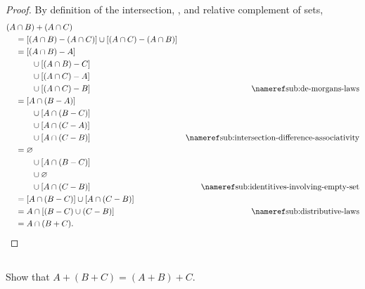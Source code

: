 \documentclass{report}
\begin{document}
\begin{proof}


  By definition of the intersection, , and
    relative complement of sets,
    \begin{align*}
      (A & \cap B) + (A \cap C) \\
        & = [(A \cap B) - (A \cap C)] \cup [(A \cap C) - (A \cap B)] \\
        & = [(A \cap B) - A] \\
          & \qquad \cup [(A \cap B) - C] \\
          & \qquad \cup [(A \cap C) - A] \\
          & \qquad \cup [(A \cap C) - B]
          & \textref{sub:de-morgans-laws} \\
        & = [A \cap (B - A)] \\
          & \qquad \cup [A \cap (B - C)] \\
          & \qquad \cup [A \cap (C - A)] \\
          & \qquad \cup [A \cap (C - B)]
          & \textref{sub:intersection-difference-associativity} \\
        & = \emptyset \\
          & \qquad \cup [A \cap (B - C)] \\
          & \qquad \cup \emptyset \\
          & \qquad \cup [A \cap (C - B)]
          & \textref{sub:identitives-involving-empty-set} \\
        & = [A \cap (B - C)] \cup [A \cap (C - B)] \\
        & = A \cap [(B - C) \cup (C - B)]
          & \textref{sub:distributive-laws} \\
        & = A \cap (B + C).
    \end{align*}

\end{proof}

\subsection{}%

Show that $A + (B + C) = (A + B) + C$.
\end{document}
